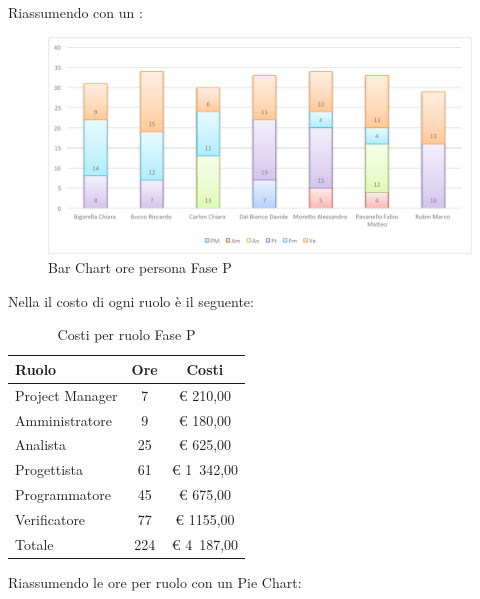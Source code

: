 				Riassumendo con un :
				\begin{figure}[H]\centering
					\includegraphics[width=\textwidth]{PianoDiProgetto/Pics/ChartOreFaseP.pdf}
					\caption{Bar Chart ore persona Fase P}
				\end{figure}
				Nella  il costo di ogni ruolo è il seguente:
				\begin{table}[H]
					\begin{center}
						\begin{tabular}{| l | c | c |}
							\hline
							Ruolo 				& Ore 	& Costi  \\ \hline
							
							Project Manager		& 7 		& \euro{} 210,00 	\\
							Amministratore 		& 9 		& \euro{} 180,00 	\\
							Analista	 		& 25 		& \euro{} 625,00 	\\
							Progettista 		& 61 		& \euro{} 1~342,00  	\\
							Programmatore		& 45 		& \euro{} 675,00 	\\
							Verificatore		& 77 		& \euro{} 1155,00 	\\ \hline \hline
							
							Totale	 			& 224 		& \euro{} 4~187,00 	\\ \hline
						\end{tabular}
					\end{center}
					\caption{Costi per ruolo Fase P}
				\end{table}
				Riassumendo le ore per ruolo con un Pie Chart:

